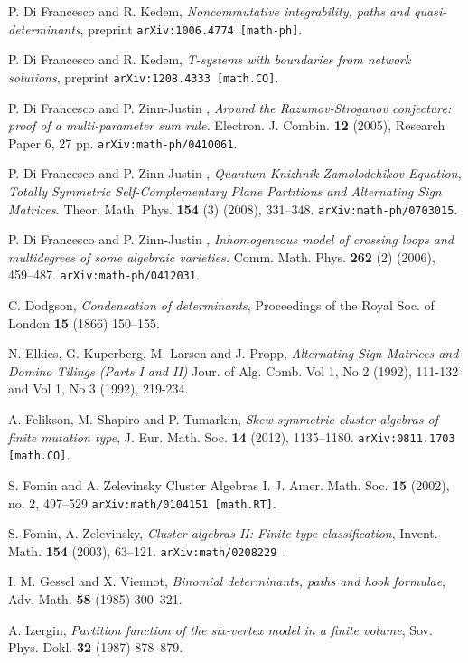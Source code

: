 \documentclass[12pt]{amsart}
\numberwithin{equation}{section}
\begin{document}
\begin{thebibliography}{10}
P. Di Francesco and R. Kedem, {\em Noncommutative integrability, 
paths and quasi-determinants}, preprint
{\tt arXiv:1006.4774 [math-ph]}.

P. Di Francesco and R. Kedem, {\em T-systems with boundaries 
from network solutions}, preprint
{\tt arXiv:1208.4333 [math.CO]}.

P. Di Francesco and P. Zinn-Justin , {\em Around the Razumov-Stroganov conjecture: 
proof of a multi-parameter sum rule.} Electron. J. Combin. {\bf 12} (2005), 
Research Paper 6, 27 pp. 
{\tt arXiv:math-ph/0410061}.

P. Di Francesco and P. Zinn-Justin , {\em Quantum Knizhnik-Zamolodchikov Equation, 
Totally Symmetric Self-Complementary Plane Partitions and Alternating Sign Matrices.} 
Theor. Math. Phys. {\bf 154} (3) (2008), 331--348. 
{\tt arXiv:math-ph/0703015}.

P. Di Francesco and  P. Zinn-Justin , {\em Inhomogeneous model of crossing 
loops and multidegrees of some algebraic varieties.} Comm. Math. Phys. {\bf 262} (2) (2006), 459--487. 
{\tt arXiv:math-ph/0412031}.

 C. Dodgson, {\em Condensation of determinants}, Proceedings
of the Royal Soc. of London {\bf 15} (1866) 150--155.

N. Elkies, G. Kuperberg, M. Larsen and J. Propp, {\em
Alternating-Sign Matrices and Domino Tilings (Parts I and II)}
Jour. of Alg. Comb. Vol 1, No 2 (1992), 111-132 and Vol 1, No 3 (1992), 219-234.

A. Felikson, M. Shapiro and P. Tumarkin, 
{\em Skew-symmetric cluster algebras of finite mutation type}, 
J. Eur. Math. Soc. {\bf 14} (2012), 1135--1180.
{\tt arXiv:0811.1703 [math.CO]}.

 S. Fomin and A. Zelevinsky Cluster Algebras I.
J. Amer. Math. Soc.   \textbf{15}  (2002),  no. 2, 497--529 
{\tt arXiv:math/0104151 [math.RT]}.
    
S. Fomin, A. Zelevinsky, {\em Cluster algebras II: Finite type classification}, 
Invent. Math. {\bf 154} (2003), 63--121.
{\tt arXiv:math/0208229 }.

 I. M. Gessel and X. Viennot, \emph{Binomial
determinants, paths and hook formulae}, Adv. Math. \textbf{58}
(1985) 300--321.  

A. Izergin, {\em Partition function of the six-vertex model in a finite volume}, 
Sov. Phys. Dokl. {\bf 32} (1987) 878--879.


\end{thebibliography}
\end{document}

